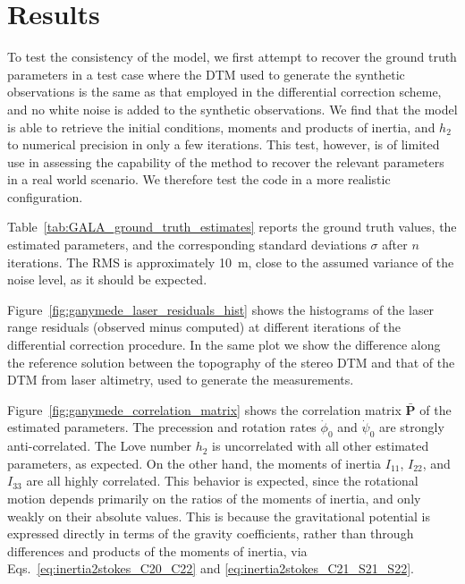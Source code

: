 \documentclass[pdflatex,sn-mathphys-num]{sn-jnl}%
\theoremstyle{thmstyleone}%
\theoremstyle{thmstyletwo}%
\theoremstyle{thmstylethree}%
\renewcommand{\vec}[1]{\boldsymbol{#1}}
\begin{document}
\section{Results}
To test the consistency of the model, we first attempt to recover the ground truth parameters in a test case where the DTM used to generate the synthetic observations is the same as that employed in the differential correction scheme, and no white noise is added to the synthetic observations. We find that the model is able to retrieve the initial conditions, moments and products of inertia, and $h_2$ to numerical precision in only a few iterations. 
This test, however, is of limited use in assessing the capability of the method to recover the relevant parameters in a real world scenario. We therefore test the code in a more realistic configuration.

%


Table~\ref{tab:GALA_ground_truth_estimates} reports the ground truth values, the estimated parameters, and the corresponding standard deviations $\sigma$ after $n$ iterations. The RMS is approximately \SI{10}{m}, close to the assumed variance of the noise level, as it should be expected. %

Figure~\ref{fig:ganymede_laser_residuals_hist} shows the histograms of the laser range residuals (observed minus computed) at different iterations of the differential correction procedure. In the same plot we show the difference along the reference solution between the topography of the stereo DTM and that of the DTM from laser altimetry, used to generate the measurements.

Figure~\ref{fig:ganymede_correlation_matrix} shows the correlation matrix $\bar{\vec{P}}$ of the estimated parameters.
%
The precession and rotation rates $\dot{\phi}_0$ and $\dot{\psi}_0$ are strongly anti-correlated.
The Love number $h_2$ is uncorrelated with all other estimated parameters, as expected.
On the other hand, the moments of inertia $I_{11}$, $I_{22}$, and $I_{33}$ are all highly correlated. This behavior is expected, since the rotational motion depends primarily on the ratios of the moments of inertia, and only weakly on their absolute values. This is because the gravitational potential is expressed directly in terms of the gravity coefficients, rather than through differences and products of the moments of inertia, via Eqs.~\eqref{eq:inertia2stokes_C20_C22} and \eqref{eq:inertia2stokes_C21_S21_S22}.
\end{document}

